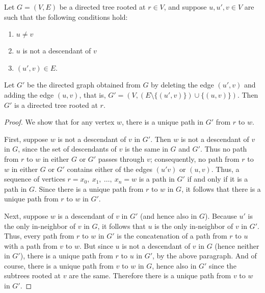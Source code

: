 \begin{lemma}
Let $G = (V, E)$ be a directed tree rooted at $r \in V$, and suppose $u, u', v \in V$ are such that the following conditions hold:
\begin{enumerate}[nosep,label=(\roman*)]
    \item $u \neq v$
    \item $u$ is not a descendant of $v$
    \item $(u', v) \in E$.
\end{enumerate}
Let $G'$ be the directed graph obtained from $G$ by deleting the edge $(u', v)$ and adding the edge $(u, v)$, that is, $G' = (V, (E \setminus \{(u', v)\}) \cup \{(u, v)\})$.
Then $G'$ is a directed tree rooted at $r$.
\label{lem:tree_add_remove}
\end{lemma}
\begin{proof}
We show that for any vertex $w$, there is a unique path in $G'$ from $r$ to $w$.

First, suppose $w$ is not a descendant of $v$ in $G'$.
Then $w$ is not a descendant of $v$ in $G$, since the set of descendants of $v$ is the same in $G$ and $G'$.
Thus no path from $r$ to $w$ in either $G$ or $G'$ passes through $v$; consequently, no path from $r$ to $w$ in either $G$ or $G'$ contains either of the edges $(u' v)$ or $(u, v)$.
Thus, a sequence of vertices $r = x_0,\ x_1,\ \ldots,\ x_n = w$ is a path in $G'$ if and only if it is a path in $G$.
Since there is a unique path from $r$ to $w$ in $G$, it follows that there is a unique path from $r$ to $w$ in $G'$.

Next, suppose $w$ is a descendant of $v$ in $G'$ (and hence also in $G$).
Because $u'$ is the only in-neighbor of $v$ in $G$, it follows that $u$ is the only in-neighbor of $v$ in $G'$.
Thus, every path from $r$ to $w$ in $G'$ is the concatenation of a path from $r$ to $u$ with a path from $v$ to $w$.
But since $u$ is not a descendant of $v$ in $G$ (hence neither in $G'$), there is a unique path from $r$ to $u$ in $G'$, by the above paragraph.
And of course, there is a unique path from $v$ to $w$ in $G$, hence also in $G'$ since the subtrees rooted at $v$ are the same.
Therefore there is a unique path from $v$ to $w$ in $G'$.
\end{proof}

